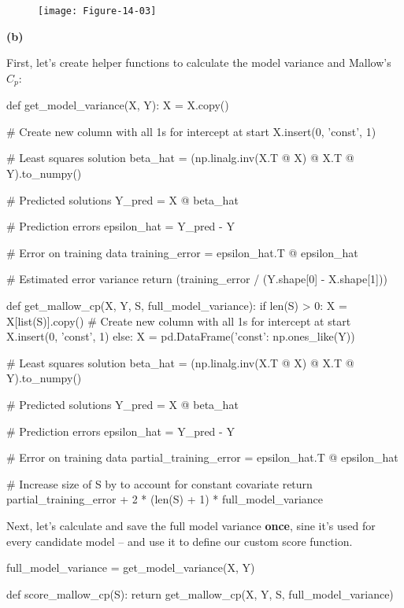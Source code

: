 \begin{figure}[H]
\texttt{[image: Figure-14-03]}
\end{figure}

\textbf{(b)}

First, let's create helper functions to calculate the model variance and
Mallow's \(C_p\):

\begin{python}
def get_model_variance(X, Y):
    X = X.copy()
    
    # Create new column with all 1s for intercept at start
    X.insert(0, 'const', 1)
    
    # Least squares solution
    beta_hat = (np.linalg.inv(X.T @ X) @ X.T @ Y).to_numpy()

    # Predicted solutions
    Y_pred = X @ beta_hat

    # Prediction errors
    epsilon_hat = Y_pred - Y

    # Error on training data
    training_error = epsilon_hat.T @ epsilon_hat
    
    # Estimated error variance
    return (training_error / (Y.shape[0] - X.shape[1]))
    

def get_mallow_cp(X, Y, S, full_model_variance):
    if len(S) > 0:
        X = X[list(S)].copy()
        # Create new column with all 1s for intercept at start
        X.insert(0, 'const', 1)
    else:
        X = pd.DataFrame({'const': np.ones_like(Y)})
    
    # Least squares solution
    beta_hat = (np.linalg.inv(X.T @ X) @ X.T @ Y).to_numpy()

    # Predicted solutions
    Y_pred = X @ beta_hat

    # Prediction errors
    epsilon_hat = Y_pred - Y

    # Error on training data
    partial_training_error = epsilon_hat.T @ epsilon_hat
    
    # Increase size of S by to account for constant covariate
    return partial_training_error + 2 * (len(S) + 1) * full_model_variance
\end{python}

Next, let's calculate and save the full model variance \textbf{once},
sine it's used for every candidate model -- and use it to define our
custom score function.

\begin{python}
full_model_variance = get_model_variance(X, Y)

def score_mallow_cp(S):
    return get_mallow_cp(X, Y, S, full_model_variance)
\end{python}


